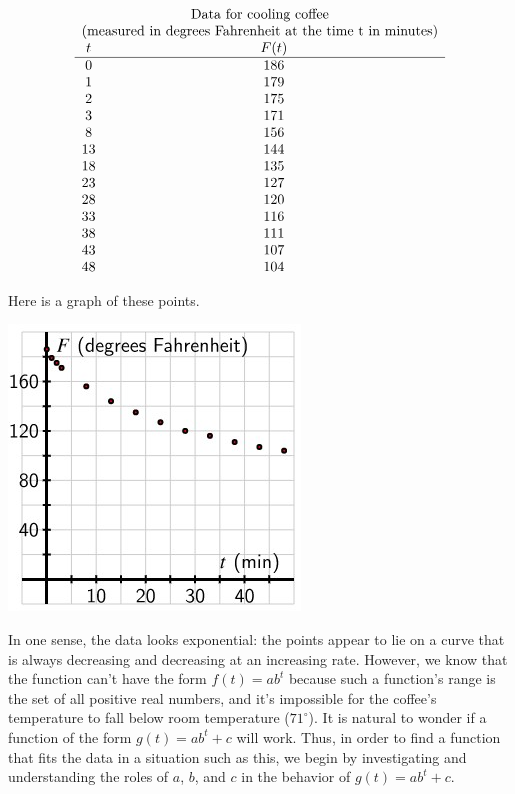 \documentclass[nooutcomes]{ximera}
\begin{document}
\[
\begin{array}{cc}
\multicolumn{2}{c}{\text{Data for cooling coffee}}\\
\multicolumn{2}{c}{\text{(measured in degrees Fahrenheit at the time t in minutes)}}\\
t&F(t)\\
\hline
0&186\\
1&179\\
2&175\\
3&171\\
8&156\\
13&144\\
18&135\\
23&127\\
28&120\\
33&116\\
38&111\\
43&107\\
48&104
\end{array}
\]

Here is a graph of these points.

\begin{image}
\includegraphics{ExpText5.jpg}
\end{image}


In one sense, the data looks exponential: the points appear to lie on a curve that is always decreasing and decreasing at an increasing rate.  However, we know that the function can't have the form \(f(t) = ab^t\) because such a function's range is the set of all positive real numbers, and it's impossible for the coffee's temperature to fall below room temperature (\(71^\circ\)).  It is natural to wonder if a function of the form \(g(t) = ab^t + c\) will work.  Thus, in order to find a function that fits the data in a situation such as this, we begin by investigating and understanding the roles of \(a\), \(b\), and \(c\) in the behavior of \(g(t) = ab^t + c\).
\end{document}
